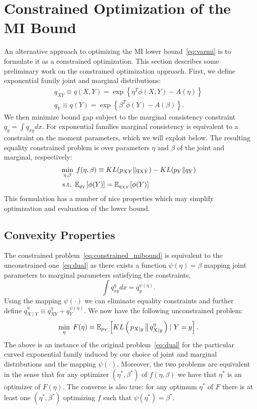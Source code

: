 \documentclass{article}
\begin{document}
\section{Constrained Optimization of the MI Bound}

An alternative approach to optimizing the MI lower
bound~\eqref{eq:varmi} is to formulate it as a constrained
optimization.  This section describes some preliminary work on the
constrained optimization approach.  First, we define exponential
family joint and marginal distributions:
\begin{gather}
  q_{XY} \equiv q(X,Y) = \exp\left\{ \eta^T \phi(X,Y) - A(\eta)
  \right\} \\
  q_Y \equiv q(Y) = \exp\left\{ \beta^T \phi(Y) - A(\beta) \right\}.
\end{gather}
We then minimize bound gap subject to the marginal consistency
constraint $q_y = \int q_{xy} dx$.  For exponential families marginal
consistency is equivalent to a constraint on the moment parameters,
which we will exploit below.  The resulting equality constrained
problem is over parameters $\eta$ and $\beta$ of the joint and
marginal, respectively:
\begin{align}\label{eq:constrained_mibound}
  &\min_{\eta, \beta} \; f(\eta, \beta) \equiv KL( p_{XY} \| q_{XY} ) - KL(
    p_Y \| q_Y ) \notag \\
  &\;\text{s.t.} \; \operatorname{\mathbb{E}}_{q_Y}[ \phi(Y) ] =
  \operatorname{\mathbb{E}}_{q_{XY}}[ \phi(Y) ]
\end{align}
This formulation has a number of nice properties which may simplify
optimization and evaluation of the lower bound.

\subsection{Convexity Properties}
The constrained problem~\eqref{eq:constrained_mibound} is equivalent
to the unconstrained one~\eqref{eq:dual} as there exists a function
$\psi(\eta) = \beta$ mapping joint parameters to marginal parameters
satisfying the constraints,
\[
  \int q_{xy}^{\eta} dx = q_y^{\psi(\eta)}.
\]
Using the mapping $\psi(\cdot)$ we can eliminate equality constraints
and further define \mbox{$q^\eta_{X\mid Y} \equiv q^\eta_{XY} \div
  q_Y^{\psi(\eta)}$}.  We now have the following unconstrained
problem:
\begin{equation}
  \min_{\eta} \; F(\eta) \equiv \operatorname{\mathbb{E}}_{p_Y}\left[ KL\left( \,p_{X\mid y}\,
      \big\| \,q_{X\mid y}^\eta\, \right) \mid Y=y \right].
\end{equation}
The above is an instance of the original problem~\eqref{eq:dual} for
the particular curved exponential family induced by our choice of
joint and marginal distributions and the mapping $\psi(\cdot)$.
Moreover, the two problems are equivalent in the sense that for any
optimizer $(\eta^*,\beta^*)$ of $f(\eta,\beta)$ we have that $\eta^*$
is an optimizer of $F(\eta)$.  The converse is also true: for any
optimum $\eta^*$ of $F$ there is at least one $(\eta^*,\beta^*)$
optimizing $f$ such that $\psi(\eta^*) = \beta^*$.  
\end{document}

